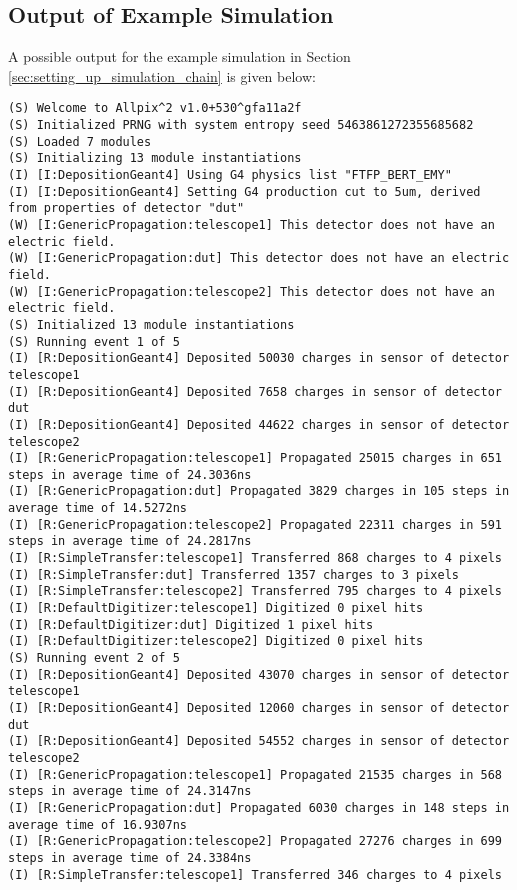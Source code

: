 \subsection{Output of Example Simulation}
\label{sec:example_output}
A possible output for the example simulation in Section \ref{sec:setting_up_simulation_chain} is given below:

\begin{lstlisting}[breaklines]
(S) Welcome to Allpix^2 v1.0+530^gfa11a2f
(S) Initialized PRNG with system entropy seed 5463861272355685682
(S) Loaded 7 modules
(S) Initializing 13 module instantiations
(I) [I:DepositionGeant4] Using G4 physics list "FTFP_BERT_EMY"
(I) [I:DepositionGeant4] Setting G4 production cut to 5um, derived from properties of detector "dut"
(W) [I:GenericPropagation:telescope1] This detector does not have an electric field.
(W) [I:GenericPropagation:dut] This detector does not have an electric field.
(W) [I:GenericPropagation:telescope2] This detector does not have an electric field.
(S) Initialized 13 module instantiations
(S) Running event 1 of 5
(I) [R:DepositionGeant4] Deposited 50030 charges in sensor of detector telescope1
(I) [R:DepositionGeant4] Deposited 7658 charges in sensor of detector dut
(I) [R:DepositionGeant4] Deposited 44622 charges in sensor of detector telescope2
(I) [R:GenericPropagation:telescope1] Propagated 25015 charges in 651 steps in average time of 24.3036ns
(I) [R:GenericPropagation:dut] Propagated 3829 charges in 105 steps in average time of 14.5272ns
(I) [R:GenericPropagation:telescope2] Propagated 22311 charges in 591 steps in average time of 24.2817ns
(I) [R:SimpleTransfer:telescope1] Transferred 868 charges to 4 pixels
(I) [R:SimpleTransfer:dut] Transferred 1357 charges to 3 pixels
(I) [R:SimpleTransfer:telescope2] Transferred 795 charges to 4 pixels
(I) [R:DefaultDigitizer:telescope1] Digitized 0 pixel hits
(I) [R:DefaultDigitizer:dut] Digitized 1 pixel hits
(I) [R:DefaultDigitizer:telescope2] Digitized 0 pixel hits
(S) Running event 2 of 5
(I) [R:DepositionGeant4] Deposited 43070 charges in sensor of detector telescope1
(I) [R:DepositionGeant4] Deposited 12060 charges in sensor of detector dut
(I) [R:DepositionGeant4] Deposited 54552 charges in sensor of detector telescope2
(I) [R:GenericPropagation:telescope1] Propagated 21535 charges in 568 steps in average time of 24.3147ns
(I) [R:GenericPropagation:dut] Propagated 6030 charges in 148 steps in average time of 16.9307ns
(I) [R:GenericPropagation:telescope2] Propagated 27276 charges in 699 steps in average time of 24.3384ns
(I) [R:SimpleTransfer:telescope1] Transferred 346 charges to 4 pixels

\end{lstlisting}
